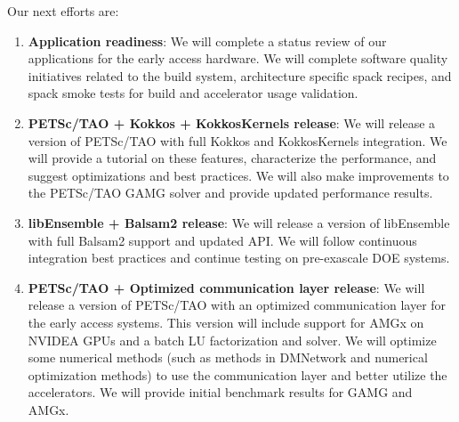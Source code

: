 Our next efforts are:
\begin{enumerate}
  \item \textbf{Application readiness}: 
  We will complete a status review of our applications for the early access hardware.  We will 
  complete software quality initiatives related to the build system, architecture specific spack 
  recipes, and spack smoke tests for build and accelerator usage validation.
  \item \textbf{PETSc/TAO + Kokkos + KokkosKernels release}:
  We will release a version of PETSc/TAO with full Kokkos and KokkosKernels integration.  We will 
  provide a tutorial on these features, characterize the performance, and suggest optimizations 
  and best practices.  
  We will also make improvements to the PETSc/TAO GAMG solver and provide updated performance results.
  \item \textbf{libEnsemble + Balsam2 release}:
  We will release a version of libEnsemble with full Balsam2 support and updated API.
  We will follow continuous integration best practices and continue testing on pre-exascale DOE systems.
  \item \textbf{PETSc/TAO + Optimized communication layer release}:
  We will release a version of PETSc/TAO with an optimized communication layer for the early access systems.  
  This version will include support for AMGx on NVIDEA GPUs and a batch LU factorization and solver.
  We will optimize some numerical methods (such as methods in DMNetwork and numerical optimization methods) 
  to use the communication layer and better utilize the accelerators.
  We will provide initial benchmark results for GAMG and AMGx.
\end{enumerate}

